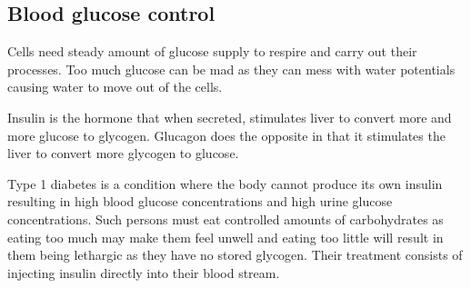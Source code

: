 \subsection{Blood glucose control}
Cells need steady amount of glucose supply to respire and carry out their processes. Too much 
glucose can be mad as they can mess with water potentials causing water to move out of the cells.

Insulin is the hormone that when secreted, stimulates liver to convert more and more glucose to
glycogen. Glucagon does the opposite in that it stimulates the liver to convert more glycogen to
glucose.

Type 1 diabetes is a condition where the body cannot produce its own insulin resulting in high
blood glucose concentrations and high urine glucose concentrations. Such persons must eat 
controlled amounts of carbohydrates as eating too much may make them feel unwell and eating too 
little will result in them being lethargic as they have no stored glycogen. Their treatment consists
of injecting insulin directly into their blood stream.

